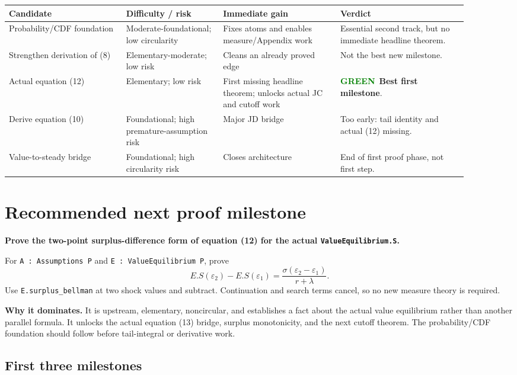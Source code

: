 \documentclass[11pt]{article}
\newcommand{\code}[1]{\nolinkurl{#1}}
\newcommand{\gradegreen}{\textcolor{green}{\textbf{GREEN}}}
\begin{document}
\begin{longtable}{@{}p{0.23\linewidth}p{0.19\linewidth}p{0.23\linewidth}p{0.25\linewidth}@{}}
\toprule
\textbf{Candidate} & \textbf{Difficulty / risk} & \textbf{Immediate gain} & \textbf{Verdict} \\
\midrule
Probability/CDF foundation & Moderate-foundational; low circularity & Fixes atoms and
enables measure/Appendix work & Essential second track, but no immediate headline theorem. \\
Strengthen derivation of (8) & Elementary-moderate; low risk & Cleans an already proved
edge & Not the best new milestone. \\
Actual equation (12) & Elementary; low risk & First missing headline theorem; unlocks
actual JC and cutoff work & \gradegreen\ \textbf{Best first milestone}. \\
Derive equation (10) & Foundational; high premature-assumption risk & Major JD bridge &
Too early: tail identity and actual (12) missing. \\
Value-to-steady bridge & Foundational; high circularity risk & Closes architecture &
End of first proof phase, not first step. \\
\bottomrule
\end{longtable}

\section{Recommended next proof milestone}

\colorbox{greenbg}{\parbox{0.93\linewidth}{
\textbf{Prove the two-point surplus-difference form of equation (12) for the actual
\code{ValueEquilibrium.S}.}

For \code{A : Assumptions P} and \code{E : ValueEquilibrium P}, prove
\[
  E.S(\varepsilon_2)-E.S(\varepsilon_1)
  =\frac{\sigma(\varepsilon_2-\varepsilon_1)}{r+\lambda}.
\]
Use \code{E.surplus_bellman} at two shock values and subtract. Continuation and search
terms cancel, so no new measure theory is required.
}}

\textbf{Why it dominates.} It is upstream, elementary, noncircular, and establishes a
fact about the actual value equilibrium rather than another parallel formula. It unlocks
the actual equation (13) bridge, surplus monotonicity, and the next cutoff theorem. The
probability/CDF foundation should follow before tail-integral or derivative work.

\subsection*{First three milestones}
\end{document}

